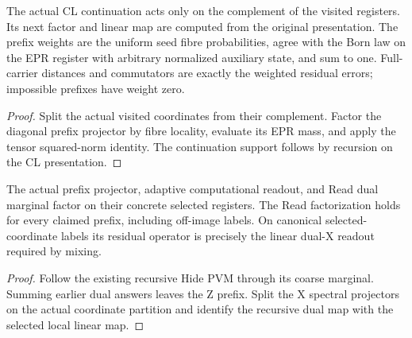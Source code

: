 \begin{lemma}
\label{lem:intro-adaptive-prefix}
\leanok
The actual CL continuation acts only on the complement of the visited registers. Its next factor and linear map are computed from the original presentation. The prefix weights are the uniform seed fibre probabilities, agree with the Born law on the EPR register with arbitrary normalized auxiliary state, and sum to one. Full-carrier distances and commutators are exactly the weighted residual errors; impossible prefixes have weight zero.
\end{lemma}
\begin{proof}
\leanok
Split the actual visited coordinates from their complement. Factor the diagonal prefix projector by fibre locality, evaluate its EPR mass, and apply the tensor squared-norm identity. The continuation support follows by recursion on the CL presentation.
\end{proof}

\begin{lemma}
\label{lem:intro-adaptive-factorization}
\leanok
The actual prefix projector, adaptive computational readout, and Read dual marginal factor on their concrete selected registers. The Read factorization holds for every claimed prefix, including off-image labels. On canonical selected-coordinate labels its residual operator is precisely the linear dual-X readout required by mixing.
\end{lemma}
\begin{proof}
\leanok
Follow the existing recursive Hide PVM through its coarse marginal. Summing earlier dual answers leaves the Z prefix. Split the X spectral projectors on the actual coordinate partition and identify the recursive dual map with the selected local linear map.
\end{proof}

